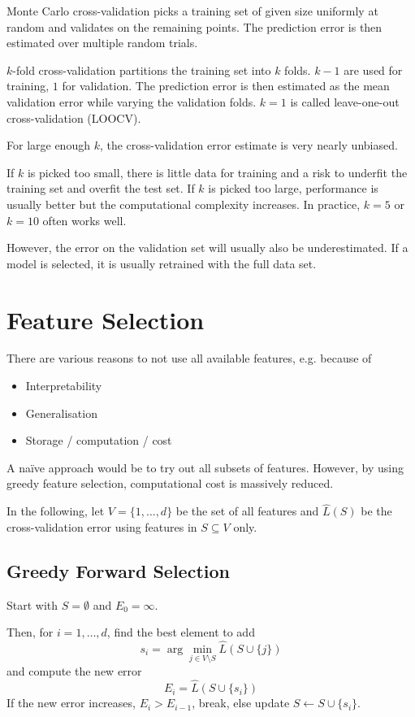 Monte Carlo cross-validation picks a training set of
given size uniformly at random and validates on the
remaining points.
The prediction error is then estimated over multiple
random trials.

$k$-fold cross-validation partitions the training set
into $k$ folds.
$k - 1$ are used for training, $1$ for validation.
The prediction error is then estimated as the mean
validation error while varying the validation folds.
$k = 1$ is called leave-one-out cross-validation (LOOCV).

For large enough $k$, the cross-validation error estimate
is very nearly unbiased.

If $k$ is picked too small, there is little data for
training and a risk to underfit the training set and
overfit the test set.
If $k$ is picked too large, performance is usually better
but the computational complexity increases.
In practice, $k = 5$ or $k = 10$ often works well.

However, the error on the validation set will usually
also be underestimated.
If a model is selected, it is usually retrained with
the full data set.


\section{Feature Selection}
There are various reasons to
not use all available features, e.g. because of
\begin{itemize}
	\item Interpretability
	\item Generalisation
	\item Storage / computation / cost
\end{itemize}

A naïve approach would be to try out all subsets of
features.
However, by using greedy feature selection,
computational cost is massively reduced.

In the following,
let $V = \{1, \dotsc, d\}$ be the set of all features
and $\hat{L}(S)$ be the cross-validation error
using features in $S \subseteq V$ only.


\subsection{Greedy Forward Selection}
Start with $S = \emptyset$ and $E_0 = \infty$.

Then, for $i = 1, \dotsc, d$,
find the best element to add
\begin{equation*}
s_i = \arg\min_{j \in V \setminus S}{
	\hat{L}(S \cup \{j\})
}
\end{equation*}
and compute the new error
\begin{equation*}
E_i = \hat{L}(S \cup \{s_i\})
\end{equation*}
If the new error increases, $E_i > E_{i-1}$,
break, else update $S \gets S \cup \{s_i\}$.

